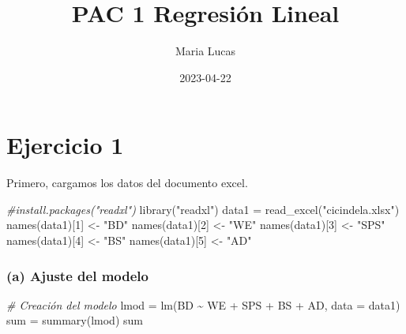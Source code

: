 \documentclass[
]{article}
\title{PAC 1 Regresión Lineal}
\author{Maria Lucas}
\date{2023-04-22}
\newenvironment{Shaded}{\begin{snugshade}}{\end{snugshade}}
\newcommand{\AttributeTok}[1]{\textcolor[rgb]{0.77,0.63,0.00}{#1}}
\newcommand{\CommentTok}[1]{\textcolor[rgb]{0.56,0.35,0.01}{\textit{#1}}}
\newcommand{\DecValTok}[1]{\textcolor[rgb]{0.00,0.00,0.81}{#1}}
\newcommand{\FunctionTok}[1]{\textcolor[rgb]{0.00,0.00,0.00}{#1}}
\newcommand{\NormalTok}[1]{#1}
\newcommand{\OtherTok}[1]{\textcolor[rgb]{0.56,0.35,0.01}{#1}}
\newcommand{\SpecialCharTok}[1]{\textcolor[rgb]{0.00,0.00,0.00}{#1}}
\newcommand{\StringTok}[1]{\textcolor[rgb]{0.31,0.60,0.02}{#1}}
\begin{document}
\maketitle

{
\setcounter{tocdepth}{4}
\tableofcontents
}
\newpage

\hypertarget{ejercicio-1}{%
\section{Ejercicio 1}\label{ejercicio-1}}

Primero, cargamos los datos del documento excel.

\begin{Shaded}
\begin{Highlighting}[]
\CommentTok{\#install.packages("readxl")}
\FunctionTok{library}\NormalTok{(}\StringTok{"readxl"}\NormalTok{)}
\NormalTok{data1 }\OtherTok{=} \FunctionTok{read\_excel}\NormalTok{(}\StringTok{"cicindela.xlsx"}\NormalTok{)}
\FunctionTok{names}\NormalTok{(data1)[}\DecValTok{1}\NormalTok{] }\OtherTok{\textless{}{-}} \StringTok{"BD"}
\FunctionTok{names}\NormalTok{(data1)[}\DecValTok{2}\NormalTok{] }\OtherTok{\textless{}{-}} \StringTok{"WE"}
\FunctionTok{names}\NormalTok{(data1)[}\DecValTok{3}\NormalTok{] }\OtherTok{\textless{}{-}} \StringTok{"SPS"}
\FunctionTok{names}\NormalTok{(data1)[}\DecValTok{4}\NormalTok{] }\OtherTok{\textless{}{-}} \StringTok{"BS"}
\FunctionTok{names}\NormalTok{(data1)[}\DecValTok{5}\NormalTok{] }\OtherTok{\textless{}{-}} \StringTok{"AD"}
\end{Highlighting}
\end{Shaded}

\hypertarget{a-ajuste-del-modelo}{%
\subsubsection{(a) Ajuste del modelo}\label{a-ajuste-del-modelo}}

\begin{Shaded}
\begin{Highlighting}[]
\CommentTok{\# Creación del modelo}
\NormalTok{lmod }\OtherTok{=} \FunctionTok{lm}\NormalTok{(BD }\SpecialCharTok{\textasciitilde{}}\NormalTok{ WE }\SpecialCharTok{+}\NormalTok{ SPS }\SpecialCharTok{+}\NormalTok{ BS }\SpecialCharTok{+}\NormalTok{ AD, }\AttributeTok{data =}\NormalTok{ data1)}
\NormalTok{sum }\OtherTok{=} \FunctionTok{summary}\NormalTok{(lmod)}
\NormalTok{sum}
\end{Highlighting}
\end{Shaded}
\end{document}
